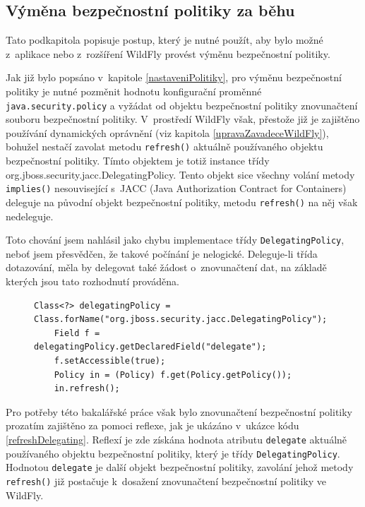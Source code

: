 \subsection{Výměna bezpečnostní politiky za běhu} \label{zmenaZaBehu}

Tato podkapitola popisuje postup, který je nutné použít, aby bylo možné z~aplikace nebo z~rozšíření WildFly provést výměnu bezpečnostní politiky.

Jak již bylo popsáno v~kapitole \ref{nastaveniPolitiky}, pro výměnu bezpečnostní politiky je nutné pozměnit hodnotu konfigurační proměnné
{\tt java.security.policy} a vyžádat od objektu bezpečnostní politiky znovunačtení souboru bezpečnostní politiky.
V~prostředí WildFly však, přestože již je zajištěno používání dynamických oprávnění (viz kapitola \ref{upravaZavadeceWildFly}), bohužel nestačí zavolat metodu {\tt refresh()} aktuálně používaného objektu bezpečnostní politiky. Tímto objektem je totiž instance třídy {org.jboss.security.jacc.DelegatingPolicy}. Tento objekt sice všechny volání metody {\tt implies()} nesouvisející s~JACC (Java Authorization Contract for Containers) deleguje na původní objekt bezpečnostní politiky, metodu {\tt refresh()} na něj však nedeleguje.

Toto chování jsem nahlásil jako chybu implementace třídy {\tt DelegatingPolicy}, neboť jsem přesvědčen, že takové počínání je nelogické. Deleguje-li třída dotazování, měla by delegovat také žádost o~znovunačtení dat, na základě kterých jsou tato rozhodnutí prováděna. \cite{issueDelegating}

\begin{figure}[tbh]
\begin{lstlisting}[caption=Znovunačtení bezpečnostní politiky při nastavené {\tt DelegatingPolicy}, label=refreshDelegating]
    Class<?> delegatingPolicy = Class.forName("org.jboss.security.jacc.DelegatingPolicy");
    Field f = delegatingPolicy.getDeclaredField("delegate");
    f.setAccessible(true);
    Policy in = (Policy) f.get(Policy.getPolicy());
    in.refresh();
\end{lstlisting}
\end{figure}

Pro potřeby této bakalářské práce však bylo znovunačtení bezpečnostní politiky prozatím zajištěno za pomoci reflexe, jak je ukázáno v~ukázce kódu \ref{refreshDelegating}.
Reflexí je zde získána hodnota atributu {\tt delegate} aktuálně používaného objektu bezpečnostní politiky, který je třídy {\tt DelegatingPolicy}.
Hodnotou {\tt delegate} je další objekt bezpečnostní politiky, zavolání jehož metody {\tt refresh()} již postačuje k~dosažení znovunačtení bezpečnostní politiky ve WildFly.

